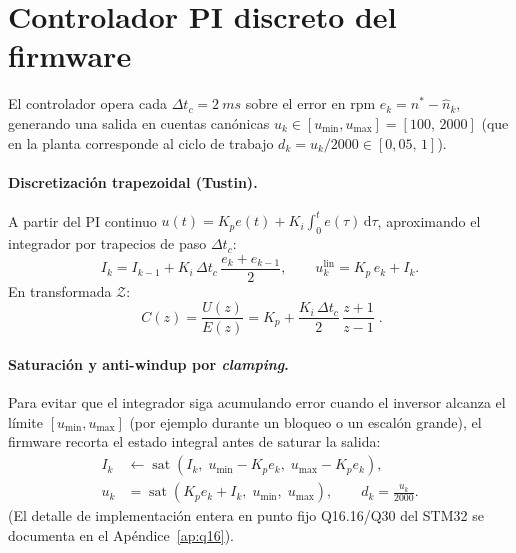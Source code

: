 \documentclass[11pt,a4paper,oneside]{report}
\theoremstyle{definition}
\theoremstyle{remark}
\newcommand{\dd}{\mathrm{d}}
\newcommand{\clamp}{\operatorname{sat}}
\begin{document}
\section{Controlador PI discreto del firmware}
El controlador opera cada $\Delta t_c = \SI{2}{ms}$ sobre el error en rpm
$e_k = n^\ast - \hat n_k$, generando una salida en cuentas canónicas
$u_k \in [u_{\min}, u_{\max}] = [100,\,2000]$ (que en la planta corresponde al
ciclo de trabajo $d_k = u_k/2000 \in [0{,}05,\,1]$).

\paragraph{Discretización trapezoidal (Tustin).} A partir del PI continuo
$u(t) = K_p e(t) + K_i\int_0^t e(\tau)\,\dd\tau$, aproximando el integrador
por trapecios de paso $\Delta t_c$:
\begin{equation}
  I_k = I_{k-1} + K_i\,\Delta t_c\,\frac{e_k + e_{k-1}}{2}, \qquad
  u_k^{\text{lin}} = K_p\,e_k + I_k .
  \label{eq:pi_tustin}
\end{equation}
En transformada $\mathcal Z$:
\begin{equation}
  \boxed{\;C(z) = \frac{U(z)}{E(z)} = K_p + \frac{K_i\,\Delta t_c}{2}\,\frac{z+1}{z-1}\;.}
  \label{eq:cz}
\end{equation}

\paragraph{Saturación y anti-windup por \emph{clamping}.} Para evitar que el
integrador siga acumulando error cuando el inversor alcanza el límite
$[u_{\min},u_{\max}]$ (por ejemplo durante un bloqueo o un escalón grande), el
firmware recorta el estado integral antes de saturar la salida:
\begin{equation}
\begin{aligned}
  I_k &\leftarrow \clamp\!\left(I_k,\; u_{\min} - K_p e_k,\; u_{\max} - K_p e_k\right), \\
  u_k &= \clamp\!\left(K_p e_k + I_k,\; u_{\min},\; u_{\max}\right),
  \qquad d_k = \frac{u_k}{2000}.
\end{aligned}
\label{eq:antiwindup}
\end{equation}
(El detalle de implementación entera en punto fijo Q16.16/Q30 del STM32 se
documenta en el Apéndice~\ref{ap:q16}).
\end{document}
